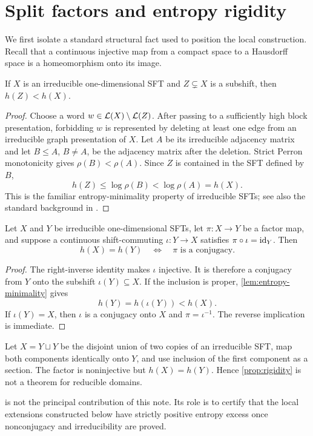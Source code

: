 \section{Split factors and entropy rigidity}
\label{sec:rigidity}

We first isolate a standard structural fact used to position the local
construction.  Recall that a continuous injective map from a compact space
to a Hausdorff space is a homeomorphism onto its image.

\begin{lemma}
\label{lem:entropy-minimality}
If $X$ is an irreducible one-dimensional SFT and
$Z\subsetneq X$ is a subshift, then $h(Z)<h(X)$.
\end{lemma}

\begin{proof}
Choose a word $w\in\mathcal L(X)\setminus\mathcal L(Z)$.  After passing to a sufficiently
high block presentation, forbidding $w$ is represented by deleting at least
one edge from an irreducible graph presentation of $X$.  Let $A$ be its
irreducible adjacency matrix and let $B\le A$, $B\ne A$, be the adjacency
matrix after the deletion.  Strict Perron monotonicity gives
$\rho(B)<\rho(A)$.  Since $Z$ is contained in the SFT defined by $B$,
\[
 h(Z)\le\log\rho(B)<\log\rho(A)=h(X).
\]
This is the familiar entropy-minimality property of irreducible SFTs; see
also the standard background in \cite{LindMarcus2021}.
\end{proof}

\begin{proposition}
\label{prop:rigidity}
Let $X$ and $Y$ be irreducible one-dimensional SFTs, let
$\pi:X\to Y$ be a factor map, and suppose a continuous shift-commuting
$\iota:Y\to X$ satisfies $\pi\circ\iota=\operatorname{id}_Y$.  Then
\[
 h(X)=h(Y)\quad\Longleftrightarrow\quad
 \pi\text{ is a conjugacy}.
\]
\end{proposition}

\begin{proof}
The right-inverse identity makes $\iota$ injective.  It is therefore a
conjugacy from $Y$ onto the subshift $\iota(Y)\subseteq X$.  If the inclusion
is proper, \cref{lem:entropy-minimality} gives
\[
 h(Y)=h(\iota(Y))<h(X).
\]
If $\iota(Y)=X$, then $\iota$ is a conjugacy onto $X$ and
$\pi=\iota^{-1}$.  The reverse implication is immediate.
\end{proof}

\begin{example}
\label{ex:reducible}
Let $X=Y\sqcup Y$ be the disjoint union of two copies of an irreducible SFT,
map both components identically onto $Y$, and use inclusion of the first
component as a section.  The factor is noninjective but
$h(X)=h(Y)$.  Hence \cref{prop:rigidity} is not a theorem for reducible
domains.
\end{example}

\begin{remark}
 is not the principal contribution of this note.  Its
role is to certify that the local extensions constructed below have strictly
positive entropy excess once nonconjugacy and irreducibility are proved.
\end{remark}

